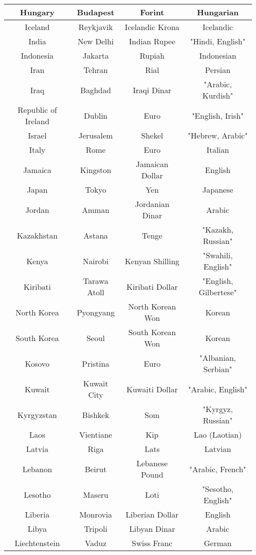 \documentclass{article}
\begin{document}
\begin{center}
\begin{tabular}{||  c c c c  ||}
Hungary & Budapest & Forint & Hungarian   \\ \hline 
Iceland & Reykjavik & Icelandic Krona & Icelandic   \\ \hline 
India & New Delhi & Indian Rupee & "Hindi, English"   \\ \hline 
Indonesia & Jakarta & Rupiah & Indonesian   \\ \hline 
Iran & Tehran & Rial & Persian   \\ \hline 
Iraq & Baghdad & Iraqi Dinar & "Arabic, Kurdish"   \\ \hline 
Republic of Ireland & Dublin & Euro & "English, Irish"   \\ \hline 
Israel & Jerusalem & Shekel & "Hebrew, Arabic"   \\ \hline 
Italy & Rome & Euro & Italian   \\ \hline 
Jamaica & Kingston & Jamaican Dollar & English   \\ \hline 
Japan & Tokyo & Yen & Japanese   \\ \hline 
Jordan & Amman & Jordanian Dinar & Arabic   \\ \hline 
Kazakhstan & Astana & Tenge & "Kazakh, Russian"   \\ \hline 
Kenya & Nairobi & Kenyan Shilling & "Swahili, English"   \\ \hline 
Kiribati & Tarawa Atoll & Kiribati Dollar & "English, Gilbertese"   \\ \hline 
North Korea & Pyongyang & North Korean Won & Korean   \\ \hline 
South Korea & Seoul & South Korean Won & Korean   \\ \hline 
Kosovo & Pristina & Euro & "Albanian, Serbian"   \\ \hline 
Kuwait & Kuwait City & Kuwaiti Dollar & "Arabic, English"   \\ \hline 
Kyrgyzstan & Bishkek & Som & "Kyrgyz, Russian"   \\ \hline 
Laos & Vientiane & Kip & Lao (Laotian)   \\ \hline 
Latvia & Riga & Lats & Latvian   \\ \hline 
Lebanon & Beirut & Lebanese Pound & "Arabic, French"   \\ \hline 
Lesotho & Maseru & Loti & "Sesotho, English"   \\ \hline 
Liberia & Monrovia & Liberian Dollar & English   \\ \hline 
Libya & Tripoli & Libyan Dinar & Arabic   \\ \hline 
Liechtenstein & Vaduz & Swiss Franc & German   \\ \hline 

\end{tabular}
\end{center}
\end{document}
